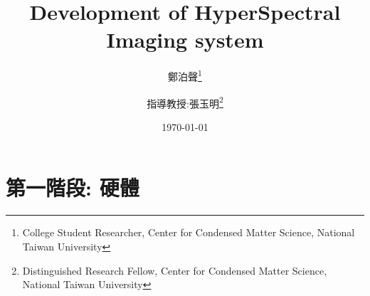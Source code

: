 \documentclass[12pt]{article}
\title{Development of HyperSpectral Imaging system}
\author{鄭泊聲\thanks{College Student Researcher, Center for Condensed Matter Science, National Taiwan University}
\and 指導教授:張玉明\thanks{Distinguished Research Fellow, Center for Condensed Matter Science, National Taiwan University}}
\date{\today}
\begin{document}
    \maketitle
    \section{第一階段: 硬體}
\end{document}
